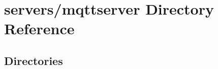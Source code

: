 \section{servers/mqttserver Directory Reference}
\label{dir_300f6a292931b404942ef1ef38f6a393}
\subsection*{Directories}
\begin{DoxyCompactItemize}
\end{DoxyCompactItemize}
